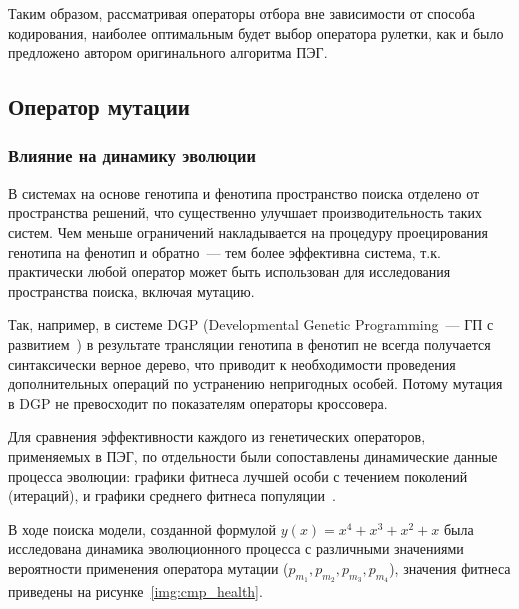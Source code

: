 Таким образом, рассматривая операторы отбора вне зависимости от способа кодирования, наиболее оптимальным будет выбор оператора рулетки, как и было предложено автором оригинального алгоритма ПЭГ.








\subsection{Оператор мутации}

\subsubsection{Влияние на динамику эволюции}

В системах на основе генотипа и фенотипа пространство поиска отделено от пространства решений, что существенно улучшает производительность таких систем. Чем меньше ограничений накладывается на процедуру проецирования генотипа на фенотип и обратно~--- тем более эффективна система, т.к. практически любой оператор может быть использован для исследования пространства поиска, включая мутацию.

Так, например, в системе DGP (Developmental Genetic Programming~--- ГП с развитием~\cite{poli2008field}) в результате трансляции генотипа в фенотип не всегда получается синтаксически верное дерево, что приводит к необходимости проведения дополнительных операций по устранению непригодных особей. Потому мутация в DGP не превосходит по показателям операторы кроссовера.

Для сравнения эффективности каждого из генетических операторов, применяемых в ПЭГ, по отдельности были сопоставлены динамические данные процесса эволюции: графики фитнеса лучшей особи с течением поколений (итераций), и графики среднего фитнеса популяции~\cite{ferreira:2002:FEA}.

В ходе поиска модели, созданной формулой $y(x) = x^4 + x^3 + x^2 + x$ была исследована динамика эволюционного процесса с различными значениями вероятности применения оператора мутации ($p_{m_1}, p_{m_2}, p_{m_3}, p_{m_4}$), значения фитнеса приведены на рисунке~\ref{img:cmp_health}.

